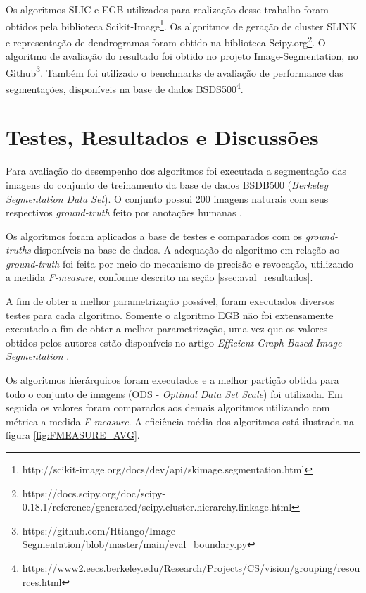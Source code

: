 \begin{document}
Os algoritmos SLIC e EGB utilizados para realização desse trabalho foram obtidos pela biblioteca Scikit-Image\footnote{http://scikit-image.org/docs/dev/api/skimage.segmentation.html}.
Os algoritmos de geração de cluster SLINK e representação de dendrogramas foram obtido na biblioteca Scipy.org\footnote{https://docs.scipy.org/doc/scipy-0.18.1/reference/generated/scipy.cluster.hierarchy.linkage.html}. 
O algoritmo de avaliação do resultado foi obtido no projeto Image-Segmentation, no Github\footnote{https://github.com/Htiango/Image-Segmentation/blob/master/main/eval\_boundary.py}. Também foi utilizado o benchmarks de avaliação de performance das segmentações, disponíveis na base de dados BSDS500\footnote{https://www2.eecs.berkeley.edu/Research/Projects/CS/vision/grouping/resources.html}.




\section{Testes, Resultados e Discussões} \label{sec:testes}

Para avaliação do desempenho dos algoritmos foi executada a segmentação das imagens do conjunto de treinamento da base de dados  BSDB500 (\textit{Berkeley Segmentation Data Set}). O conjunto possui 200 imagens naturais com seus respectivos \textit{ground-truth} feito por anotações humanas \cite{BSDS500}. 

Os algoritmos foram aplicados a base de testes e comparados com os \textit{ground-truths} disponíveis na base de dados. A adequação do algoritmo em relação ao \textit{ground-truth} foi feita por meio do mecanismo de precisão e revocação, utilizando a medida \textit{F-measure}, conforme descrito na seção \ref{ssec:aval_resultados}.

A  fim de obter a melhor parametrização possível, foram executados diversos testes para cada algoritmo. Somente o algoritmo EGB não foi extensamente executado a fim de obter a melhor parametrização, uma vez que os valores obtidos pelos autores estão disponíveis no artigo \textit{Efficient Graph-Based Image Segmentation} \cite{FELZENSZWALB}. 

Os algoritmos hierárquicos foram executados e a melhor partição obtida para todo o conjunto de imagens (ODS - \textit{Optimal Data Set Scale}) \cite{CONT_EMPIRICAL} foi utilizada. Em seguida os valores foram comparados aos demais algoritmos utilizando com métrica a medida \textit{F-measure}. A eficiência média dos algoritmos está ilustrada na figura \ref{fig:FMEASURE_AVG}.
\end{document}
